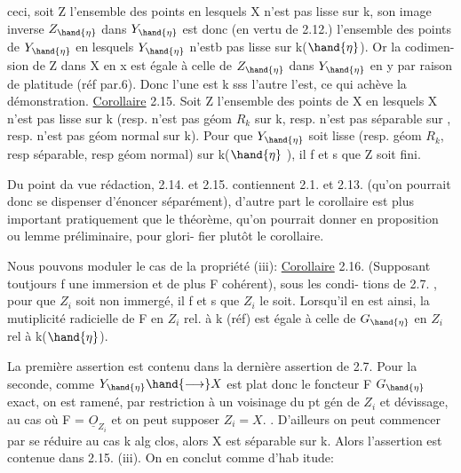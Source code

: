 
ceci, soit Z l'ensemble des points en lesquels X n'est pas lisse sur
k, son image inverse $Z_{\hand{\eta}}$ dans $Y_{\hand{\eta}}$ est donc (en vertu de 2.12.)   l'ensemble des
points de $Y_{\hand{\eta}}$ en lesquels $Y_{\hand{\eta}}$ n'estb pas lisse sur k($\hand{\eta}$). Or  la codimen-%
sion de  Z dans X en x  est égale à celle de  $Z_{\hand{\eta}}$ dans $Y_{\hand{\eta}}$  en y par
raison de platitude (réf par.6). Donc l'une est \hand{$>$}k  sss l'autre l'est,
ce qui achève la démonstration.
\uline{Corollaire} 2.15.   Soit Z l'ensemble des points de X en lesquels
X n'est pas lisse sur k (resp. n'est pas  géom $R_k$ sur k, resp. n'est
\placedmargin{\unsure{//}} pas séparable sur  , resp. n'est pas géom normal sur k). Pour que $Y_{\hand{\eta}}$ soit
lisse (resp.  géom $R_k$, resp séparable, resp géom normal) sur k($\hand{\eta}$ ), il
f et s  que Z soit fini.

\placedmargin{$|$} Du point da vue rédaction, 2.14. et 2.15.  contiennent 2.1. et
2.13. (qu'on pourrait donc se dispenser d'énoncer séparément), d'autre
part le corollaire est plus important pratiquement que le théorème,
qu'on pourrait donner en proposition ou lemme préliminaire, pour glori-%
fier plutôt le corollaire.

Nous pouvons  moduler   le cas de la propriété (iii):
\uline{Corollaire} 2.16.  (Supposant toutjours f une immersion et de plus F cohérent), sous les condi-%
\placedmargin{\unsure{//}} tions de 2.7. , pour que $Z_i$ soit non immergé, il f et s que $Z_i$  le soit.
Lorsqu'il en est ainsi, la mutiplicité radicielle de F en $Z_i$  rel.
à k (réf) est égale à celle de $G_{\hand{\eta}}$  en $Z_i$  rel à k($\hand{\eta}$).

La première assertion est contenu dans la dernière assertion de
2.7. Pour la seconde, comme  $Y_{\hand{\eta}} \hand{\longrightarrow} X$ est plat donc le foncteur F \hand{$\rightsquigarrow$} $G_{\hand{\eta}}$
exact,  on est ramené, par restriction à un voisinage du pt gén de $Z_i$
et dévissage, au cas où F = $\underline{O}_{Z_i}$ et on peut supposer $Z_i = X$. . D'ailleurs on peut commencer par
se réduire au cas k alg clos, alors X est séparable sur k. Alors  l'assertion  est
contenue dans 2.15. (iii).   On en conclut comme d'hab itude:


